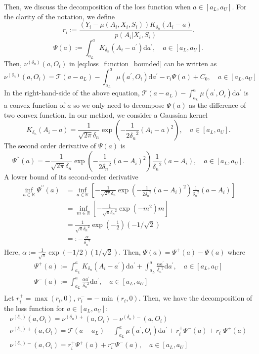 \documentclass[12pt]{article}
\newcommand{\R}{\mathbb{R}}
\begin{document}
Then, we discuss the decomposition of the loss function when $a\in[a_L,a_U]$. For the clarity of the notation, we define
$$r_i:=\frac{(Y_i - \mu(A_i,X_i,S_i))K_{\delta_n}(A_i-a)}{p(A_{i}|X_{i},S_{i})}.$$
$$\Psi(a) := \int_{a_L}^a K_{\delta_n}(A_i-a^\prime)\mathrm{d}a^\prime,\quad a\in[a_L,a_U].$$
Then, $\nu^{({\delta_n})}(a,O_i)$ in \eqref{eq:loss_function_bounded} can be written as 
$$\nu^{({\delta_n})}(a, O_i) 
   = 
   \mathcal{T}(a-a_L) -\int_{a_L}^a\mu(a^\prime,O_i)\mathrm{d}a^\prime - r_i\Psi(a) + C_0,\quad a \in[a_L,a_U]$$
In the right-hand-side of the above equation, $\mathcal{T}(a-a_L) -\int_{a_L}^a\mu(a^\prime,O_i)\mathrm{d}a^\prime$ is a convex function of $a$ so we only need to decompose $\Psi(a)$ as the difference of two convex function. In our method, we consider a Gaussian kernel 
$$K_{\delta_n}(A_i-a) = \frac{1}{\sqrt{2\pi}{\delta_n}} \exp\left(-\frac{1}{2{\delta_n}^2}(A_i-a)^2\right),\quad a\in[a_L,a_U].$$
The second order derivative of $\Psi(a)$ is
$$\Psi^{\prime\prime}(a)=-\frac{1}{\sqrt{2\pi}{\delta_n}} \exp\left(-\frac{1}{2{\delta_n}^2}(a-A_i)^2\right)\frac{1}{{\delta_n}^2}(a-A_i),\quad a\in[a_L,a_U].$$
A lower bound of its second-order derivative
\begin{align*}
\inf_{a\in\R}\Psi^{\prime\prime}(a)&= \inf_{a\in\R}\left[-\frac{1}{\sqrt{2\pi}{\delta_n}} \exp\left(-\frac{1}{2{\delta_n}^2}(a-A_i)^2\right)\frac{1}{{\delta_n}^2}(a-A_i)\right]\\
&=\inf_{m\in\R}\left[-\frac{1}{\sqrt{\pi}{\delta_n}^2} \exp\left(-m^2\right)m\right]\\
&=\frac{1}{\sqrt{\pi}{\delta_n}^2} \exp\left(-\frac{1}{2}\right)(-1/\sqrt{2})\\
& =: -\frac{\alpha}{{\delta_n}^2}
\end{align*}
Here, $\alpha:=\frac{1}{\sqrt{\pi}} \exp\left(-1/2\right)(1/\sqrt{2})$. Then, $\Psi(a) = \Psi^{+}(a) - \Psi^{}(a)$ where
\begin{gather*}
    \Psi^{+}(a):=\int_{a_L}^a K_{\delta_n}(A_i-a^\prime)\mathrm{d}a^\prime +\int_{a_L}^a \frac{\alpha a^\prime}{{\delta_n}^2}\mathrm{d}a^\prime,\quad a\in[a_L,a_U] \\
    \Psi^{-}(a):=\int_{a_L}^a \frac{\alpha a^\prime}{{\delta_n}^2}\mathrm{d}a^\prime,\quad a\in[a_L,a_U] \\
\end{gather*}
 Let $r_i^{+} = \max(r_i, 0)$, $r_i^{-} = -\min(r_i, 0)$. Then, we have the decomposition of the loss function for $a\in[a_L,a_U]$:
\begin{gather*}
\nu^{({\delta_n})}(a, O_i) = \nu^{({\delta_n})+}(a, O_i) - \nu^{({\delta_n})-}(a, O_i)\\
    \nu^{({\delta_n})+}(a, O_i) 
   = \mathcal{T}(a-a_L) -\int_{a_L}^a\mu(a^\prime,O_i)\mathrm{d}a^\prime + r_i^{+}\Psi^{-}(a)+ r_i^{-}\Psi^{+}(a)\\
    \nu^{({\delta_n})-}(a, O_i) 
   = r_i^{+}\Psi^{+}(a)+ r_i^{-}\Psi^{-}(a) ,\quad a\in[a_L,a_U]
\end{gather*}
\end{document}
